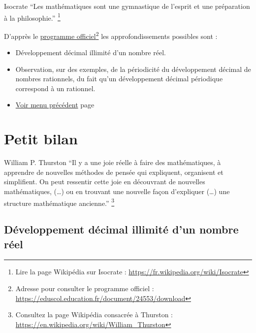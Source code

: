 \documentclass[a4paper,11pt]{book}
\begin{document}
\begin{myquote}{Isocrate}
\enquote{Les mathématiques sont une gymnastique de l'esprit et une
préparation à la philosophie.}
\footnote{Lire la page Wikipédia sur Isocrate : \url{https://fr.wikipedia.org/wiki/Isocrate}}
\end{myquote}

\clearpage
D'apprès le \href{https://eduscol.education.fr/document/24553/download}{programme officiel}\footnote{Adresse pour consulter le programme officiel :
\url{https://eduscol.education.fr/document/24553/download}} les approfondissements
possibles sont :

\begin{itemize}
\item Développement décimal illimité d'un nombre réel.
\item Observation, sur des exemples, de la périodicité du développement
décimal de nombres rationnels, du fait qu'un développement décimal
périodique correspond à un rationnel.
\end{itemize}


\begin{itemize}
\item \hyperref[org82a5705]{Voir menu précédent}
page~\pageref{page:deeps-menu}
\end{itemize}


\clearpage

\chapter{Petit bilan}
\label{sec:orga8b9a8b}
\label{org419d7e0}
\label{page:sec6.2bilan}

\begin{myquote}{William P. Thurston}
\enquote{Il y a une joie réelle à faire des mathématiques, à apprendre de
nouvelles méthodes de pensée qui expliquent, organisent et
simplifient. On peut ressentir cette joie en découvrant de
nouvelles mathématiques, (…) ou en trouvant une nouvelle façon
d’expliquer (…) une structure mathématique ancienne.}
\footnote{Consultez la page Wikipédia consacrée à Thurston : \url{https://en.wikipedia.org/wiki/William_Thurston}}
\end{myquote}


\clearpage

\section{Développement décimal illimité d'un nombre réel}
\label{sec:org824dcb5}
\end{document}
